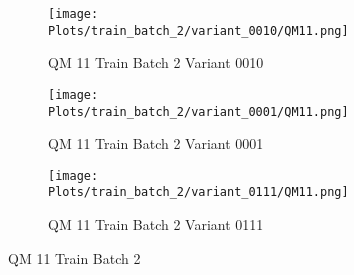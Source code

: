 \documentclass{DissertateFigs}
\begin{document}
\begin{figure}[t!]
\medskip

    \begin{subfigure}{0.47\textwidth}
    \texttt{[image: Plots/train\_batch\_2/variant\_0010/QM11.png]}
    \caption{QM 11 Train Batch 2 Variant 0010}
    \end{subfigure}
    \begin{subfigure}{0.47\textwidth}
    \texttt{[image: Plots/train\_batch\_2/variant\_0001/QM11.png]}
    \caption{QM 11 Train Batch 2 Variant 0001}
    \end{subfigure}

\medskip

    \begin{subfigure}{0.47\textwidth}
    \texttt{[image: Plots/train\_batch\_2/variant\_0111/QM11.png]}
    \caption{QM 11 Train Batch 2 Variant 0111}
    \end{subfigure}
\caption{QM 11 Train Batch 2}
    \end{figure}
\clearpage
\end{document}
